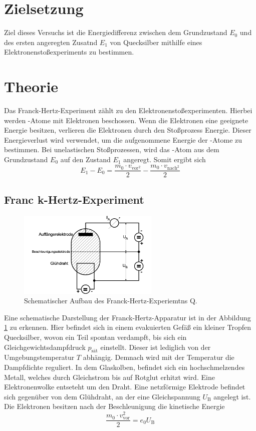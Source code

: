 \nocite{anleitungV601}
\section{Zielsetzung}
\label{sec:Zielsetzung}
Ziel dieses Versuchs ist die Energiedifferenz zwischen dem Grundzustand $E_0$ und des ersten angeregten Zusatnd $E_1$ von Quecksilber mithilfe
eines Elektronenstoßexperiments zu bestimmen. 
\section{Theorie}
\label{sec:Theorie}
Das Franck-Hertz-Experiment zählt zu den Elektronenstoßexperimenten. Hierbei werden -Atome mit Elektronen beschossen. Wenn die Elektronen
eine geeignete Energie besitzen, verlieren die Elektronen durch den Stoßprozess Energie. Dieser Energieverlust wird verwendet, um die aufgenommene Energie
der -Atome zu bestimmen. Bei unelastischen Stoßprozessen, wird das -Atom aus dem Grundzustand $E_0$ auf den Zustand $E_1$ angeregt.
Somit ergibt sich 
\begin{equation}
    E_1 - E_0 =\frac{m_0\cdot v_{\text{vor}^2}}{2} - \frac{m_0\cdot v_{\text{nach}^2}}{2}
    \label{eqn:Energiedifferenz}
\end{equation}
\subsection{Franc k-Hertz-Experiment}
\label{sec:Franck-Hertz-Experiment}
\begin{figure}[H]
  \centering
  \includegraphics[width=0.6\textwidth]{content/Bilder/schematischerAufbau.png}
  \caption{Schematischer Aufbau des Franck-Hertz-Experiemtns Q\cite{anleitungV601}.}
  \label{fig:schematischerAufbau}
\end{figure}
Eine schematische Darstellung der Franck-Hertz-Apparatur ist in der Abbildung \ref{fig:schematischerAufbau} zu erkennen. Hier befindet sich in einem 
evakuierten Gefäß ein kleiner Tropfen Quecksilber, wovon ein Teil spontan verdampft, bis sich ein Gleichgewichtsdampfdruck $p_{\text{sät}}$ einstellt. 
Dieser ist lediglich von der Umgebungstemperatur $T$ abhängig. Demnach wird mit der Temperatur die Dampfdichte reguliert. 
In dem Glaskolben, befindet sich ein hochschmelzendes Metall, welches durch Gleichstrom bis auf Rotglut erhitzt wird. Eine Elektronenwolke entseteht um den Draht.
Eine netzförmige Elektrode befindet sich gegenüber von dem Glühdraht, an der eine Gleichspannung $U_\text{B}$ angelegt ist. Die Elektronen besitzen nach der Beschleunigung die 
kinetische Energie 
\begin{equation}
    \frac{m_0\cdot v_{\text{vor}}^2}{2}= e_0U_{\text{B}} 
    \label{eqn:E_kin}
\end{equation}
